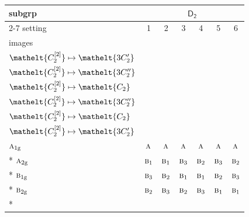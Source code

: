 \documentclass[10pt,a4paper]{article}
\numberwithin{equation}{section}
\newcommand{\eltfont}[1]{{\let\sigma\eltsigma\mathelt{#1}}}
\newcommand{\grp}[1]{\mathsf{#1}}
\newcommand{\irr}[1]{\text{\normalfont\scshape #1}}
\newcommand{\cls}[1]{\eltfont{#1}}
\newcommand{\ptag}[1]{\mathrm{#1}}
\newcommand{\genidx}[2]{#1^{[\mathrm{#2}]}}
\begin{document}
{\small\begin{longtable}{@{}lcccccc@{}}\toprule
subgrp & \multicolumn{6}{c}{\href{D2.pdf}{$\grp{D_{2}}$}}\\\cmidrule(lr){2-7}
setting & 1 & 2 & 3 & 4 & 5 & 6\\
images & {\scriptsize\begin{tabular}[t]{@{}c@{}}$\cls{\genidx{C_{2}}{1}} \mapsto \cls{C_{2}}$\\$\cls{\genidx{C_{2}}{2}} \mapsto \cls{3C_{2}'}$\end{tabular}} & {\scriptsize\begin{tabular}[t]{@{}c@{}}$\cls{\genidx{C_{2}}{1}} \mapsto \cls{C_{2}}$\\$\cls{\genidx{C_{2}}{2}} \mapsto \cls{3C_{2}''}$\end{tabular}} & {\scriptsize\begin{tabular}[t]{@{}c@{}}$\cls{\genidx{C_{2}}{1}} \mapsto \cls{3C_{2}'}$\\$\cls{\genidx{C_{2}}{2}} \mapsto \cls{C_{2}}$\end{tabular}} & {\scriptsize\begin{tabular}[t]{@{}c@{}}$\cls{\genidx{C_{2}}{1}} \mapsto \cls{3C_{2}'}$\\$\cls{\genidx{C_{2}}{2}} \mapsto \cls{3C_{2}''}$\end{tabular}} & {\scriptsize\begin{tabular}[t]{@{}c@{}}$\cls{\genidx{C_{2}}{1}} \mapsto \cls{3C_{2}''}$\\$\cls{\genidx{C_{2}}{2}} \mapsto \cls{C_{2}}$\end{tabular}} & {\scriptsize\begin{tabular}[t]{@{}c@{}}$\cls{\genidx{C_{2}}{1}} \mapsto \cls{3C_{2}''}$\\$\cls{\genidx{C_{2}}{2}} \mapsto \cls{3C_{2}'}$\end{tabular}}\\\midrule\endhead
\bottomrule\endfoot\endlastfoot
$\irr{a}_{1\ptag{g}}$ & $\irr{a}$ & $\irr{a}$ & $\irr{a}$ & $\irr{a}$ & $\irr{a}$ & $\irr{a}$\\*
$\irr{a}_{2\ptag{g}}$ & $\irr{b}_{1}$ & $\irr{b}_{1}$ & $\irr{b}_{3}$ & $\irr{b}_{2}$ & $\irr{b}_{3}$ & $\irr{b}_{2}$\\*
$\irr{b}_{1\ptag{g}}$ & $\irr{b}_{3}$ & $\irr{b}_{2}$ & $\irr{b}_{1}$ & $\irr{b}_{1}$ & $\irr{b}_{2}$ & $\irr{b}_{3}$\\*
$\irr{b}_{2\ptag{g}}$ & $\irr{b}_{2}$ & $\irr{b}_{3}$ & $\irr{b}_{2}$ & $\irr{b}_{3}$ & $\irr{b}_{1}$ & $\irr{b}_{1}$\\*

\end{longtable}}
\end{document}

